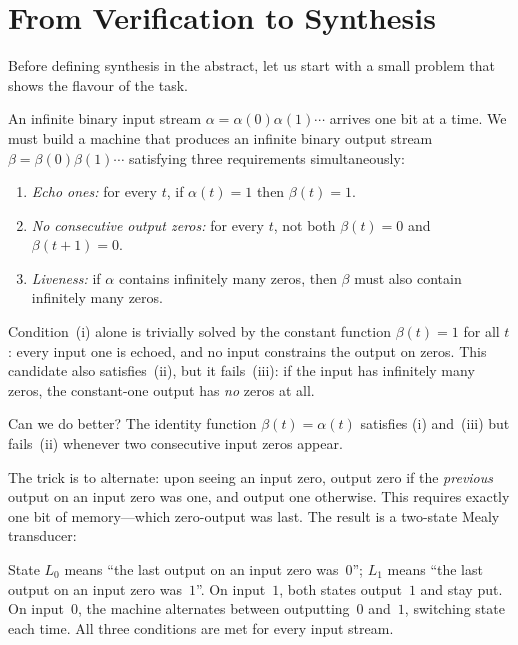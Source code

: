 \section{From Verification to Synthesis}
\label{sec:verification-to-synthesis}

Before defining synthesis in the abstract, let us start with a small
problem that shows the flavour of the task.

\begin{example}
\label{ex:three-properties}
An infinite binary input stream $\alpha=\alpha(0)\alpha(1)\cdots$ arrives
one bit at a time.  We must build a machine that produces an infinite
binary output stream $\beta=\beta(0)\beta(1)\cdots$ satisfying three
requirements simultaneously:
\begin{enumerate}[nosep,label=(\roman*)]
  \item \emph{Echo ones:} for every $t$, if $\alpha(t)=1$ then
        $\beta(t)=1$.
  \item \emph{No consecutive output zeros:} for every $t$, not both
        $\beta(t)=0$ and $\beta(t+1)=0$.
  \item \emph{Liveness:} if $\alpha$ contains infinitely many zeros, then
        $\beta$ must also contain infinitely many zeros.
\end{enumerate}
Condition~(i) alone is trivially solved by the constant function
$\beta(t)=1$ for all $t$: every input one is echoed, and no input
constrains the output on zeros.  This candidate also satisfies~(ii), but
it fails~(iii): if the input has infinitely many zeros, the constant-one
output has \emph{no} zeros at all.

Can we do better?  The identity function $\beta(t)=\alpha(t)$ satisfies
(i) and~(iii) but fails~(ii) whenever two consecutive input zeros
appear.

The trick is to alternate: upon seeing an input zero, output zero if the
\emph{previous} output on an input zero was one, and output one
otherwise.  This requires exactly one bit of memory---which zero-output
was last.  The result is a two-state Mealy transducer:
\begin{center}
\end{center}
State $L_0$ means ``the last output on an input zero was~$0$'';
$L_1$ means ``the last output on an input zero was~$1$''.  On input~$1$,
both states output~$1$ and stay put.  On input~$0$, the machine
alternates between outputting~$0$ and~$1$, switching state each time.
All three conditions are met for every input stream.
\end{example}

